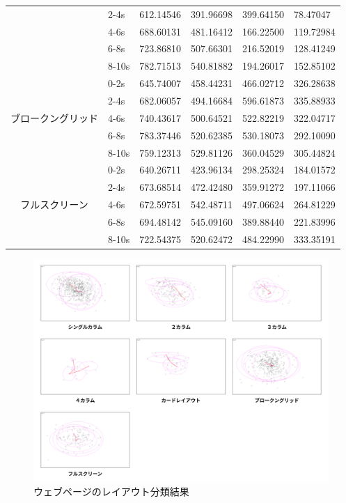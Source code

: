 \begin{table}[h]
\begin{tabular}{clllll}
    & 2-4s & 612.14546 & 391.96698 & 399.64150 & 78.47047 \\
    & 4-6s & 688.60131 & 481.16412 & 166.22500 & 119.72984 \\
    & 6-8s & 723.86810 & 507.66301 & 216.52019 & 128.41249 \\
    & 8-10s & 782.71513 & 540.81882 & 194.26017 & 152.85102 \\
    \hline
    \multirow{5}{*}{ブロークングリッド} & 0-2s & 645.74007 & 458.44231 & 466.02712 & 326.28638 \\
    & 2-4s & 682.06057 & 494.16684 & 596.61873 & 335.88933 \\
    & 4-6s & 740.43617 & 500.64521 & 522.82219 & 322.04717 \\
    & 6-8s & 783.37446 & 520.62385 & 530.18073 & 292.10090 \\
    & 8-10s & 759.12313 & 529.81126 & 360.04529 & 305.44824 \\
    \hline
    \multirow{5}{*}{フルスクリーン} & 0-2s & 640.26711 & 423.96134 & 298.25324 & 184.01572 \\
    & 2-4s & 673.68514 & 472.42480 & 359.91272 & 197.11066 \\
    & 4-6s & 672.59751 & 542.48711 & 497.06624 & 264.81229 \\
    & 6-8s & 694.48142 & 545.09160 & 389.88440 & 221.83996 \\
    & 8-10s & 722.54375 & 520.62472 & 484.22990 & 333.35191 \\
    \hline
  \end{tabular}
\end{table}

\begin{figure}[H]
  \centering
  \includegraphics[width=12cm]{figures/05_layout_result.jpg}
  \caption{ウェブページのレイアウト分類結果}
  \label{fig_layout_result}
\end{figure}


